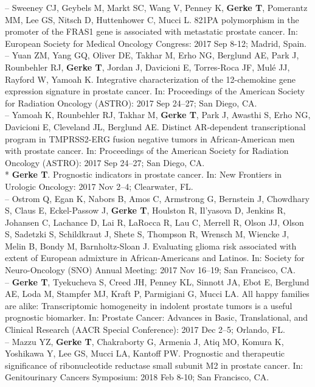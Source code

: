 \documentclass[11pt, a4paper]{article} %
\begin{document}
-- Sweeney CJ, Geybels M, Markt SC, Wang V, Penney K, {\bf Gerke T}, Pomerantz MM, Lee GS, Nitsch D, Huttenhower C, Mucci L. 821PA polymorphism in the promoter of the FRAS1 gene is associated with metastatic prostate cancer. In: European Society for Medical Oncology Congress: 2017 Sep 8-12; Madrid, Spain.\\

-- Yuan ZM, Yang GQ, Oliver DE, Takhar M, Erho NG, Berglund AE, Park J, Rounbehler RJ, {\bf Gerke T}, Jordan J, Davicioni E, Torres-Roca JF, Mul\'{e} JJ, Rayford W, Yamoah K. Integrative characterization of the 12-chemokine gene expression signature in prostate cancer. In: Proceedings of the American Society for Radiation Oncology (ASTRO): 2017 Sep 24--27; San Diego, CA.\\

-- Yamoah K, Rounbehler RJ, Takhar M, {\bf Gerke T}, Park J, Awasthi S, Erho NG, Davicioni E, Cleveland JL, Berglund AE. Distinct AR-dependent transcriptional program in TMPRSS2-ERG fusion negative tumors in African-American men with prostate cancer. In: Proceedings of the American Society for Radiation Oncology (ASTRO): 2017 Sep 24--27; San Diego, CA.\\

* {\bf Gerke T}. Prognostic indicators in prostate cancer. In: New Frontiers in Urologic Oncology: 2017 Nov 2--4; Clearwater, FL.\\

-- Ostrom Q, Egan K, Nabors B, Amos C, Armstrong G, Bernstein J, Chowdhary S, Claus E, Eckel-Passow J, {\bf Gerke T}, Houlston R, Il'yasova D, Jenkins R, Johansen C, Lachance D, Lai R, LaRocca R, Lau C, Merrell R, Olson JJ, Olson S, Sadetzki S, Schildkraut J, Shete S, Thompson R, Wrensch M, Wiencke J, Melin B, Bondy M, Barnholtz-Sloan J. Evaluating glioma risk associated with extent of European admixture in African-Americans and Latinos. In: Society for Neuro-Oncology (SNO) Annual Meeting: 2017 Nov 16--19; San Francisco, CA.\\

-- {\bf Gerke T}, Tyekucheva S, Creed JH, Penney KL, Sinnott JA, Ebot E, Berglund AE, Loda M, Stampfer MJ, Kraft P, Parmigiani G, Mucci LA. All happy families are alike: Transcriptomic homogeneity in indolent prostate tumors is a useful prognostic biomarker. In: Prostate Cancer: Advances in Basic, Translational, and Clinical Research (AACR Special Conference): 2017 Dec 2--5; Orlando, FL.\\

-- Mazzu YZ, {\bf Gerke T}, Chakraborty G, Armenia J, Atiq MO, Komura K, Yoshikawa Y, Lee GS, Mucci LA, Kantoff PW. Prognostic and therapeutic significance of ribonucleotide reductase small subunit M2 in prostate cancer. In: Genitourinary Cancers Symposium: 2018 Feb 8-10; San Francisco, CA.\\
\end{document}

